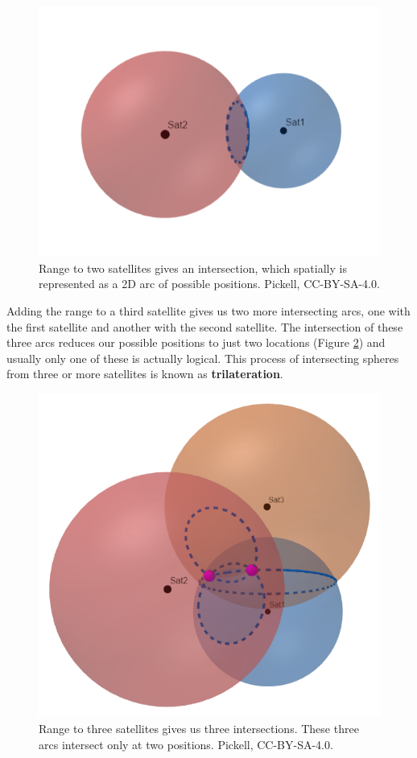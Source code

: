 \documentclass[
]{book}
\begin{document}
\begin{figure}
\includegraphics[width=0.75\linewidth]{images/14-two-gnss-satellites} \caption{Range to two satellites gives an intersection, which spatially is represented as a 2D arc of possible positions. Pickell, CC-BY-SA-4.0.}\label{fig:14-two-gnss-satellites}
\end{figure}

Adding the range to a third satellite gives us two more intersecting arcs, one with the first satellite and another with the second satellite. The intersection of these three arcs reduces our possible positions to just two locations (Figure \ref{fig:14-three-gnss-satellites}) and usually only one of these is actually logical. This process of intersecting spheres from three or more satellites is known as \textbf{trilateration}.

\begin{figure}
\includegraphics[width=0.75\linewidth]{images/14-three-gnss-satellites} \caption{Range to three satellites gives us three intersections. These three arcs intersect only at two positions. Pickell, CC-BY-SA-4.0.}\label{fig:14-three-gnss-satellites}
\end{figure}
\end{document}
